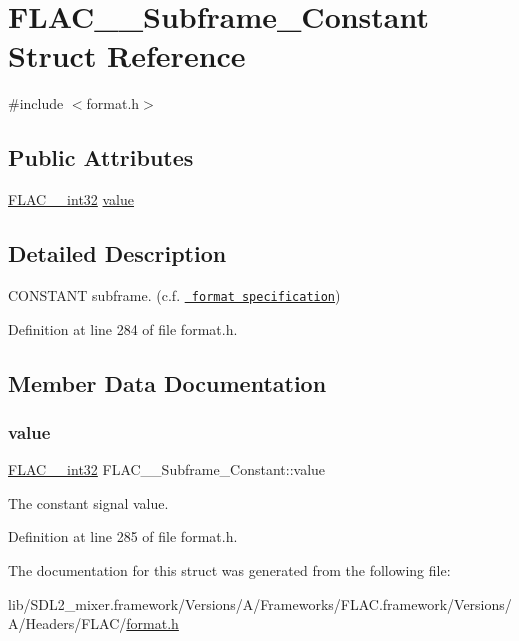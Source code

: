\hypertarget{struct_f_l_a_c_____subframe___constant}{}\section{F\+L\+A\+C\+\_\+\+\_\+\+Subframe\+\_\+\+Constant Struct Reference}
\label{struct_f_l_a_c_____subframe___constant}


{\ttfamily \#include $<$format.\+h$>$}

\subsection*{Public Attributes}
\begin{DoxyCompactItemize}
\item 
\mbox{\hyperlink{ordinals_8h_a33fd77bfe6d685541a0c034a75deccdc}{F\+L\+A\+C\+\_\+\+\_\+int32}} \mbox{\hyperlink{struct_f_l_a_c_____subframe___constant_af1bcfcbb17f1e1edb115b002fdbaa70e}{value}}
\end{DoxyCompactItemize}


\subsection{Detailed Description}
C\+O\+N\+S\+T\+A\+NT subframe. (c.\+f. \href{../format.html\#subframe_constant}{\texttt{ format specification}}) 

Definition at line 284 of file format.\+h.



\subsection{Member Data Documentation}
\mbox{\label{struct_f_l_a_c_____subframe___constant_af1bcfcbb17f1e1edb115b002fdbaa70e}} 
\subsubsection{\texorpdfstring{value}{value}}
{\footnotesize\ttfamily \mbox{\hyperlink{ordinals_8h_a33fd77bfe6d685541a0c034a75deccdc}{F\+L\+A\+C\+\_\+\+\_\+int32}} F\+L\+A\+C\+\_\+\+\_\+\+Subframe\+\_\+\+Constant\+::value}

The constant signal value. 

Definition at line 285 of file format.\+h.



The documentation for this struct was generated from the following file\+:\begin{DoxyCompactItemize}
\item 
lib/\+S\+D\+L2\+\_\+mixer.\+framework/\+Versions/\+A/\+Frameworks/\+F\+L\+A\+C.\+framework/\+Versions/\+A/\+Headers/\+F\+L\+A\+C/\mbox{\hyperlink{format_8h}{format.\+h}}\end{DoxyCompactItemize}

